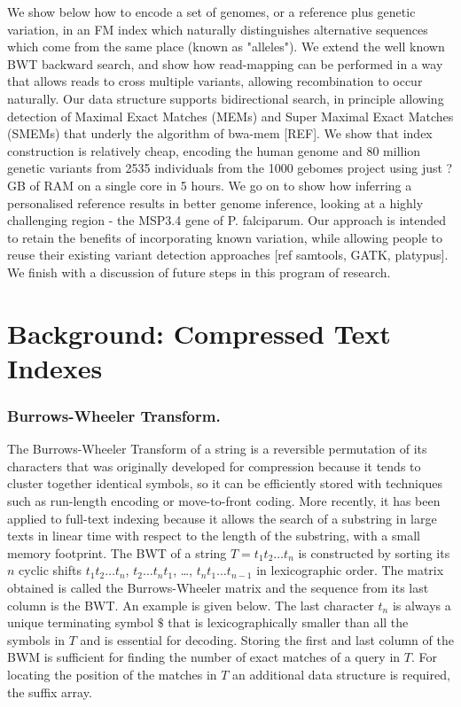 \documentclass[runningheads,a4paper]{llncs}
\begin{document}
 We show below how to encode a set of genomes, or a reference plus  genetic variation, in an FM index which naturally distinguishes alternative sequences which come from the same place (known as "alleles"). We extend the well known BWT backward search, and show how read-mapping can be performed in a way that allows reads to cross multiple variants, allowing recombination to occur naturally. Our data structure  supports bidirectional search, in principle allowing detection of Maximal Exact Matches (MEMs) and Super Maximal Exact Matches (SMEMs) that underly the algorithm of bwa-mem [REF]. We show that index construction is relatively cheap, encoding the human genome and 80 million genetic variants from 2535 individuals from the 1000 gebomes project using just ? GB of RAM on a single core in 5 hours. We go on to show how inferring a personalised reference results in better genome inference, looking at a highly challenging region - the MSP3.4 gene of P. falciparum. Our approach is intended to retain the benefits of incorporating known variation, while allowing people to reuse their existing variant detection approaches [ref samtools, GATK, platypus]. We finish with a discussion of future steps in this program of research.

\section{Background: Compressed Text Indexes}

\subsubsection{Burrows-Wheeler Transform.}
The Burrows-Wheeler Transform of a string is a reversible permutation of its characters that was originally developed for compression because it tends to cluster together identical symbols, so it can be efficiently stored with techniques such as run-length encoding or move-to-front coding. More recently, it has been applied to full-text indexing because it allows the search of a substring in large texts in linear time with respect to the length of the substring, with a small memory footprint. The BWT of a string $T=t_1t_2 \ldots t_n$ is constructed by sorting its $n$ cyclic shifts $t_1t_2 \ldots t_n$, $t_2 \ldots t_n t_1$, \ldots,  $t_n t_1 \ldots t_{n-1}$ in lexicographic order. The matrix obtained is called the Burrows-Wheeler matrix and the sequence from its last column is the BWT. An example is given below. The last character $t_n$ is always a unique terminating symbol $\$$ that is lexicographically smaller than all the symbols in $T$ and is essential for decoding. Storing the first and last column of the BWM is sufficient for finding the number of exact matches of a query in $T$. For locating the position of the matches in $T$ an additional data structure is required, the suffix array. 
\end{document}
